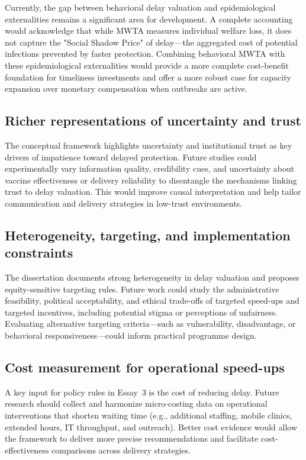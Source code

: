 \documentclass[doublespacing]{utdthesis}
\begin{document}
Currently, the gap between behavioral delay valuation and epidemiological externalities remains a significant area for development. A complete accounting would acknowledge that while MWTA measures individual welfare loss, it does not capture the "Social Shadow Price" of delay—the aggregated cost of potential infections prevented by faster protection. Combining behavioral MWTA with these epidemiological externalities would provide a more complete cost-benefit foundation for timeliness investments and offer a more robust case for capacity expansion over monetary compensation when outbreaks are active.

\subsection{Richer representations of uncertainty and trust}
The conceptual framework highlights uncertainty and institutional trust as key drivers of impatience toward delayed protection. Future studies could experimentally vary information quality, credibility cues, and uncertainty about vaccine effectiveness or delivery reliability to disentangle the mechanisms linking trust to delay valuation. This would improve causal interpretation and help tailor communication and delivery strategies in low-trust environments.

\subsection{Heterogeneity, targeting, and implementation constraints}
The dissertation documents strong heterogeneity in delay valuation and proposes equity-sensitive targeting rules. Future work could study the administrative feasibility, political acceptability, and ethical trade-offs of targeted speed-ups and targeted incentives, including potential stigma or perceptions of unfairness. Evaluating alternative targeting criteria—such as vulnerability, disadvantage, or behavioral responsiveness—could inform practical programme design.

\subsection{Cost measurement for operational speed-ups}
A key input for policy rules in Essay~3 is the cost of reducing delay. Future research should collect and harmonize micro-costing data on operational interventions that shorten waiting time (e.g., additional staffing, mobile clinics, extended hours, IT throughput, and outreach). Better cost evidence would allow the framework to deliver more precise recommendations and facilitate cost-effectiveness comparisons across delivery strategies.
\end{document}
